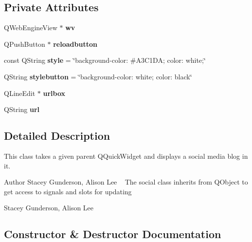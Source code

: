 \subsection*{Private Attributes}
\begin{DoxyCompactItemize}
\item 
\mbox{\label{classsocial_af3bc85613901d458ce579967d5f1fb38}} 
Q\+Web\+Engine\+View $\ast$ {\bfseries wv}
\item 
\mbox{\label{classsocial_ad4e1926a47c20d06b0ee910ab298d9a9}} 
Q\+Push\+Button $\ast$ {\bfseries reloadbutton}
\item 
\mbox{\label{classsocial_a16d2a524d4366696b9cff6d04426aa63}} 
const Q\+String {\bfseries style} = \char`\"{}background-\/color\+: \#A3\+C1\+DA; color\+: white;\char`\"{}
\item 
\mbox{\label{classsocial_ae4ed1fe9e3a3dbd9492ad2689509228e}} 
Q\+String {\bfseries stylebutton} = \char`\"{}background-\/color\+: white; color\+: black\char`\"{}
\item 
\mbox{\label{classsocial_abaae965357c4daea14964c1c5237a9d4}} 
Q\+Line\+Edit $\ast$ {\bfseries urlbox}
\item 
\mbox{\label{classsocial_abadd3b592cd9a28b0201595f4c448ffc}} 
Q\+String {\bfseries url}
\end{DoxyCompactItemize}


\subsection{Detailed Description}
This class takes a given parent Q\+Quick\+Widget and displays a social media blog in it. 

\begin{DoxyAuthor}{Author}
Stacey Gunderson, Alison Lee ~\newline
The social class inherits from Q\+Object to get access to signals and slots for updating 

Stacey Gunderson, Alison Lee 
\end{DoxyAuthor}


\subsection{Constructor \& Destructor Documentation}
\mbox{\label{classsocial_ae8c36ee55976d5b9fb5f7738be4ed2c1}} 
